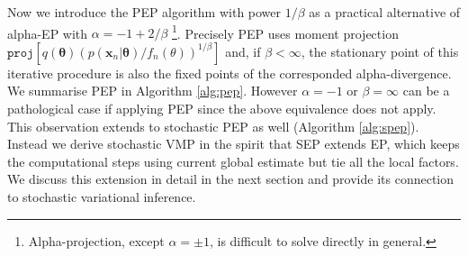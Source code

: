 \documentclass{article} %
\begin{document}
Now we introduce the PEP algorithm with power $1 / \beta$ as a practical alternative of alpha-EP with $\alpha = -1 + 2 / \beta$ \footnote{Alpha-projection, except $\alpha = \pm 1$, is difficult to solve directly in general.}. Precisely PEP uses moment projection $\mathtt{proj}[q(\bm{\theta}) (p(\bm{x}_n|\bm{\theta}) / f_n(\theta))^{1/\beta}]$ and, if $\beta < \infty$, the stationary point of this iterative procedure is also the fixed points of the corresponded alpha-divergence. 
%
We summarise PEP in Algorithm \ref{alg:pep}. However $\alpha = -1$ or $\beta = \infty$ can be a pathological case if applying PEP since the above equivalence does not apply. This observation extends to stochastic PEP as well (Algorithm \ref{alg:spep}). Instead we derive stochastic VMP in the spirit that SEP extends EP, which keeps the computational steps using current global estimate but tie all the local factors. We discuss this extension in detail in the next section and provide its connection to stochastic variational inference.
\end{document}
